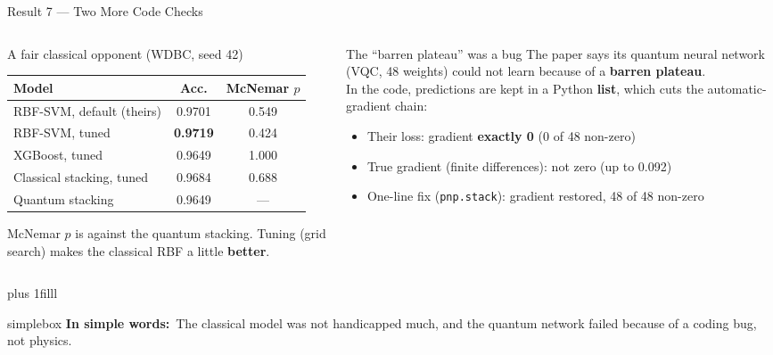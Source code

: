 \documentclass[aspectratio=169,11pt,t,xcolor={table}]{beamer}
\newcommand{\insimple}[1]{%
  \par\vskip 0pt plus 1filll
  \begin{beamercolorbox}[wd=\textwidth,sep=4pt,rounded=true]{simplebox}%
    \small\textbf{\textcolor{qamber!75!black}{In simple words:}}\ #1%
  \end{beamercolorbox}\vskip1pt}
\begin{document}
\begin{frame}{Result 7 --- Two More Code Checks}
  \begin{columns}[T,onlytextwidth]
    \begin{column}{0.49\textwidth}
      \begin{block}{A fair classical opponent (WDBC, seed 42)}
        \scriptsize\setlength{\tabcolsep}{3pt}
        \begin{tabular}{@{}lcc@{}}
          \toprule
          Model & Acc. & McNemar $p$ \\
          \midrule
          RBF-SVM, default (theirs) & 0.9701 & 0.549 \\
          RBF-SVM, tuned & \textbf{0.9719} & 0.424 \\
          XGBoost, tuned & 0.9649 & 1.000 \\
          Classical stacking, tuned & 0.9684 & 0.688 \\
          \rowcolor{qred!8} Quantum stacking & 0.9649 & --- \\
          \bottomrule
        \end{tabular}\par
        \vspace{1mm}
        \footnotesize McNemar $p$ is against the quantum stacking. Tuning (grid search) makes the classical RBF a little \textbf{better}.
      \end{block}
    \end{column}
    \begin{column}{0.49\textwidth}
      \begin{block}{The ``barren plateau'' was a bug}
        \footnotesize
        The paper says its quantum neural network (VQC, 48 weights) could not learn because of a \textbf{barren plateau}.\\[3pt]
        In the code, predictions are kept in a Python \textbf{list}, which cuts the automatic-gradient chain:
        \begin{itemize}\setlength{\itemsep}{1pt}
          \item Their loss: gradient \textbf{exactly 0} (0 of 48 non-zero)
          \item True gradient (finite differences): not zero (up to 0.092)
          \item One-line fix (\texttt{pnp.stack}): gradient restored, 48 of 48 non-zero
        \end{itemize}
      \end{block}
    \end{column}
  \end{columns}
  \insimple{The classical model was not handicapped much, and the quantum network failed because of a coding bug, not physics.}
\end{frame}
\end{document}

